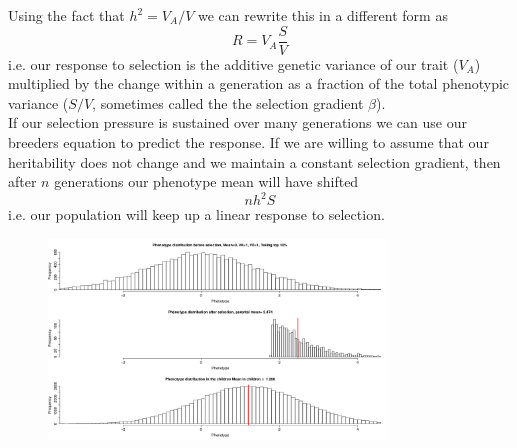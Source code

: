 Using the fact that $h^2=V_A/V$ we can rewrite this in a different form as
\begin{equation}
R= V_A \frac{S}{V}
\end{equation}
i.e. our response to selection is the additive genetic variance of our
trait ($V_A$) multiplied by the change within a generation as a
fraction of the total phenotypic variance ($S/V$, sometimes called the
the selection gradient $\beta$).\\

If our selection pressure is sustained over many generations we can
use our breeders equation to predict the response. If we are willing
to assume that our heritability does not change and we maintain a constant selection
gradient, then after $n$ generations our phenotype mean will have
shifted 
\begin{equation}
n h^2 S
\end{equation}
i.e. our population will keep up a linear response to selection.

\begin{figure}
\begin{center}
\includegraphics[width=0.8\textwidth]{figures/QT3.png}
\end{center}
\end{figure}

